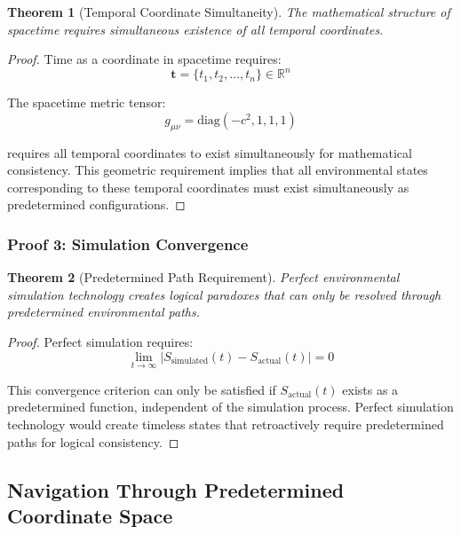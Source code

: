 \documentclass[12pt,a4paper]{article}
\newtheorem{theorem}{Theorem}
\begin{document}
\begin{theorem}[Temporal Coordinate Simultaneity]
The mathematical structure of spacetime requires simultaneous existence of all temporal coordinates.
\end{theorem}

\begin{proof}
Time as a coordinate in spacetime requires:
\begin{equation}
\mathbf{t} = \{t_1, t_2, \ldots, t_n\} \in \mathbb{R}^n
\end{equation}

The spacetime metric tensor:
\begin{equation}
g_{\mu\nu} = \text{diag}(-c^2, 1, 1, 1)
\end{equation}

requires all temporal coordinates to exist simultaneously for mathematical consistency. This geometric requirement implies that all environmental states corresponding to these temporal coordinates must exist simultaneously as predetermined configurations.
\end{proof}

\subsubsection{Proof 3: Simulation Convergence}

\begin{theorem}[Predetermined Path Requirement]
Perfect environmental simulation technology creates logical paradoxes that can only be resolved through predetermined environmental paths.
\end{theorem}

\begin{proof}
Perfect simulation requires:
\begin{equation}
\lim_{t \to \infty} |S_{\text{simulated}}(t) - S_{\text{actual}}(t)| = 0
\end{equation}

This convergence criterion can only be satisfied if $S_{\text{actual}}(t)$ exists as a predetermined function, independent of the simulation process. Perfect simulation technology would create timeless states that retroactively require predetermined paths for logical consistency.
\end{proof}

\subsection{Navigation Through Predetermined Coordinate Space}
\end{document}
